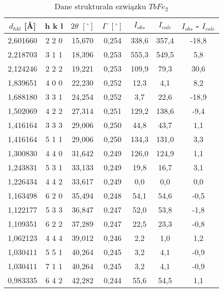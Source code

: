 \documentclass[a4paper,12pt]{article}
\numberwithin{equation}{section}
\begin{document}
\begin{appendices}
\begin{longtable}[c]{|c|c|c|c|c|c|c|}
 \end{longtable}



  \label{TbRentgenTab}
  \scriptsize
  \begin{longtable}[c]{|c|c|c|c|c|c|c|}
\caption{Dane strukturaln ezwiązku $TbFe_2$}\\
  \hline
    $d_{hkl}$ [\AA]&	h	k	l&$2\theta$ $\left[ ^{\circ}\right]$&$\Gamma$ $\left[ ^{\circ}\right]$&$I_{obs}$&$I_{calc}$	&$I_{obs}$ - $I_{calc}$	\\\hline\hline
2,601660	&	2   2   0	&	15,670	&	0,254	&	338,6	&	357,4	&	-18,8	\\\hline
2,218703	&	3   1   1	&	18,396	&	0,253	&	555,3	&	549,5	&	5,8	\\\hline
2,124246	&	2   2   2	&	19,221	&	0,253	&	109,9	&	79,3	&	30,6	\\\hline
1,839651	&	4   0   0	&	22,230	&	0,252	&	12,3	&	4,1	&	8,2	\\\hline
1,688180	&	3   3   1	&	24,254	&	0,252	&	3,7	&	22,6	&	-18,9	\\\hline
1,502069	&	4   2   2	&	27,314	&	0,251	&	129,2	&	138,6	&	-9,4	\\\hline
1,416164	&	3   3   3	&	29,006	&	0,250	&	44,8	&	43,7	&	1,1	\\\hline
1,416164	&	5   1   1	&	29,006	&	0,250	&	134,3	&	131,0	&	3,3	\\\hline
1,300830	&	4   4   0	&	31,642	&	0,249	&	126,0	&	124,9	&	1,1	\\\hline
1,243831	&	5   3   1	&	33,133	&	0,249	&	19,8	&	16,7	&	3,1	\\\hline
1,226434	&	4   4   2	&	33,617	&	0,249	&	0,0	&	0,0	&	0,0	\\\hline
1,163498	&	6   2   0	&	35,494	&	0,248	&	54,1	&	54,6	&	-0,5	\\\hline
1,122177	&	5   3   3	&	36,847	&	0,247	&	52,0	&	53,8	&	-1,8	\\\hline
1,109351	&	6   2   2	&	37,289	&	0,247	&	22,5	&	23,3	&	-0,8	\\\hline
1,062123	&	4   4   4	&	39,012	&	0,246	&	2,2	&	1,0	&	1,2	\\\hline
1,030411	&	5   5   1	&	40,264	&	0,245	&	3,2	&	4,1	&	-0,9	\\\hline
1,030411	&	7   1   1	&	40,264	&	0,245	&	3,2	&	4,1	&	-0,9	\\\hline
0,983335	&	6   4   2	&	42,282	&	0,244	&	55,6	&	54,5	&	1,1	\\\hline

\end{longtable}
\end{appendices}
\end{document}
